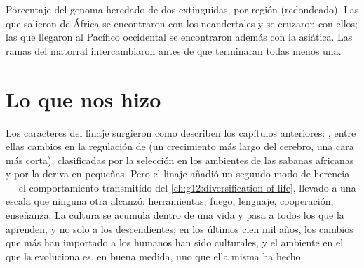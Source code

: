 \begin{omfigure}

{\small Porcentaje del genoma heredado de dos  extinguidas,
por región (redondeado). Las  que salieron de África se
encontraron con los neandertales y se cruzaron con ellos; las que
llegaron al Pacífico occidental se encontraron además con la 
asiática. Las ramas del matorral intercambiaron  antes de que
terminaran todas menos una.}
\end{omfigure}

\section{Lo que nos hizo}

\begin{proposition}\label{prop:g12:human-evolution:culture}
Los caracteres del linaje surgieron como describen los capítulos
anteriores: , entre ellas cambios en la regulación de  (un crecimiento más largo del cerebro, una cara más
corta), clasificadas por la selección en los ambientes de las sabanas
africanas y por la deriva en  pequeñas. Pero el linaje
añadió un segundo modo de herencia --- el comportamiento transmitido
del \cref{ch:g12:diversification-of-life}, llevado a una escala que
ninguna otra  alcanzó: herramientas, fuego, lenguaje,
cooperación, enseñanza. La cultura se acumula dentro de una vida y pasa
a todos los que la aprenden, y no solo a los descendientes; en los
últimos cien mil años, los cambios que más han importado a los humanos
han sido culturales, y el ambiente en el que la  evoluciona es,
en buena medida, uno que ella misma ha hecho.
\end{proposition}
\admitted

